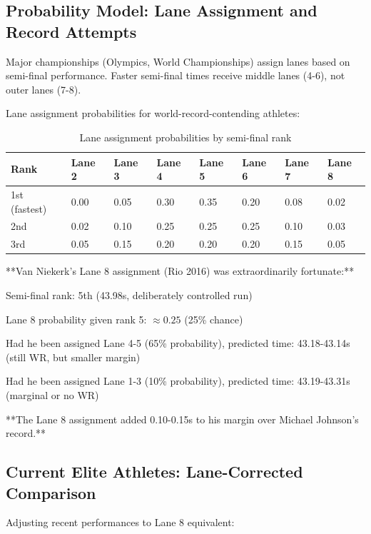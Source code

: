 \subsection{Probability Model: Lane Assignment and Record Attempts}

Major championships (Olympics, World Championships) assign lanes based on semi-final performance. Faster semi-final times receive middle lanes (4-6), not outer lanes (7-8).

Lane assignment probabilities for world-record-contending athletes:
\begin{table}[H]
\centering
\caption{Lane assignment probabilities by semi-final rank}
\begin{tabular}{@{}llllllll@{}}
\toprule
\textbf{Rank} & \textbf{Lane 2} & \textbf{Lane 3} & \textbf{Lane 4} & \textbf{Lane 5} & \textbf{Lane 6} & \textbf{Lane 7} & \textbf{Lane 8} \\
\midrule
1st (fastest) & 0.00 & 0.05 & 0.30 & 0.35 & 0.20 & 0.08 & 0.02 \\
2nd & 0.02 & 0.10 & 0.25 & 0.25 & 0.25 & 0.10 & 0.03 \\
3rd & 0.05 & 0.15 & 0.20 & 0.20 & 0.20 & 0.15 & 0.05 \\
\bottomrule
\end{tabular}
\end{table}

**Van Niekerk's Lane 8 assignment (Rio 2016) was extraordinarily fortunate:**

Semi-final rank: 5th (43.98s, deliberately controlled run)

Lane 8 probability given rank 5: $\approx 0.25$ (25\% chance)

Had he been assigned Lane 4-5 (65\% probability), predicted time: 43.18-43.14s (still WR, but smaller margin)

Had he been assigned Lane 1-3 (10\% probability), predicted time: 43.19-43.31s (marginal or no WR)

**The Lane 8 assignment added 0.10-0.15s to his margin over Michael Johnson's record.**

\subsection{Current Elite Athletes: Lane-Corrected Comparison}

Adjusting recent performances to Lane 8 equivalent:

